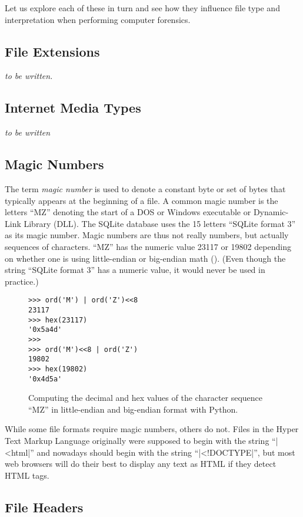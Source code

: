 Let us explore each of these in turn and see how they influence
file type and interpretation when performing computer forensics.

\subsection{File Extensions}

\emph{to be written.}

\subsection{Internet Media Types}

\emph{to be written}

\subsection{Magic Numbers}

The term \emph{magic number} is used to denote a constant byte or set
of bytes that typically appears at the beginning of a file. A common
magic number is the letters ``MZ'' denoting the start of a DOS or
Windows executable or Dynamic-Link Library (DLL). The SQLite database
uses the 15 letters ``SQLite format 3'' as its magic number. Magic numbers are
thus not really numbers, but actually sequences of characters. ``MZ'' has
the numeric value 23117 or 19802 depending on whether one is using
little-endian or big-endian math (). (Even though the
string ``SQLite format 3'' has a numeric value, it would never be used
in practice.)

\begin{figure}
\begin{Verbatim}
>>> ord('M') | ord('Z')<<8
23117
>>> hex(23117)
'0x5a4d'
>>> 
>>> ord('M')<<8 | ord('Z')
19802
>>> hex(19802)
'0x4d5a'
\end{Verbatim}
\caption{Computing the decimal and hex values of the character
  sequence ``MZ'' in little-endian and big-endian format with
  Python.}\label{calc-mz}
\end{figure}

While some file formats require magic numbers, others do not. Files in
the Hyper Text Markup Language originally were supposed to begin with
the string ``|<html|'' and nowadays should begin with the string
``|<!DOCTYPE|'', but most web browsers will do their best to display
any text as HTML if they detect HTML tags.

\subsection{File Headers}

